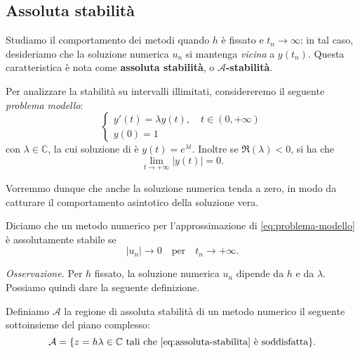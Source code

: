 \subsection{Assoluta stabilità}
Studiamo il comportamento dei metodi quando $h$ è fissato e $t_{n}\rightarrow \infty $: in tal caso, desideriamo che la soluzione numerica $u_{n}$ si mantenga \textit{vicina} a $y( t_{n})$. Questa caratteristica è nota come \textbf{assoluta stabilità}, o $\mathcal{A}$\textbf{-stabilità}.

Per analizzare la stabilità su intervalli illimitati, considereremo il seguente \textit{problema modello}:
\begin{equation}\tag{PMod}
\begin{cases}
y'(t) =\lambda y(t) ,\quad t\in ( 0,+\infty )\\
y(0) =1
\end{cases}
\label{eq:problema-modello}
\end{equation}
con $\lambda \in \mathbb{C}$, la cui soluzione di è $y(t) =e^{\lambda t}$. Inoltre se $\Re ( \lambda ) < 0$, si ha che $$\lim\limits _{t\rightarrow +\infty }| y(t)| =0.$$


Vorremmo dunque che anche la soluzione numerica tenda a zero, in modo da catturare il comportamento asintotico della soluzione vera.
\begin{definition}
Diciamo che un metodo numerico per l'approssimazione di \eqref{eq:problema-modello} è assolutamente stabile se
\begin{equation}
| u_{n}| \rightarrow 0\quad \text{per} \quad t_{n}\rightarrow +\infty.
\end{equation}
\label{eq:assoluta-stabilita}
\end{definition}

\textit{Osservazione.}
Per $h$ fissato, la soluzione numerica $u_{n}$ dipende da $h$ e da $\lambda $. Possiamo quindi dare la seguente definizione.
\begin{definition}
Definiamo $\mathcal{A}$ la regione di assoluta stabilità di un metodo numerico il seguente sottoinsieme del piano complesso:
$$\mathcal{A} =\{z=h\lambda \in \mathbb{C} \text{ tali che \eqref{eq:assoluta-stabilita} è soddisfatta}\}.$$
\end{definition}

